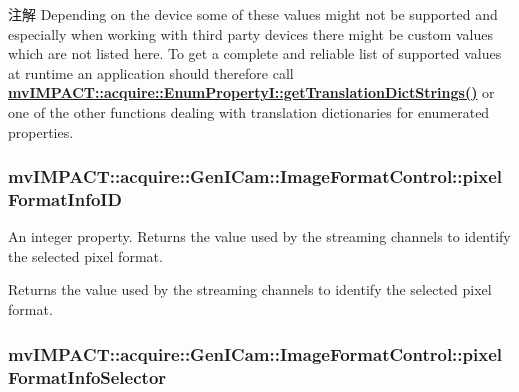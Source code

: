 \begin{DoxyNote}{注解}
Depending on the device some of these values might not be supported and especially when working with third party devices there might be custom values which are not listed here. To get a complete and reliable list of supported values at runtime an application should therefore call {\bfseries \hyperlink{classmv_i_m_p_a_c_t_1_1acquire_1_1_enum_property_i_a0ba6ccbf5ee69784d5d0b537924d26b6}{mv\+I\+M\+P\+A\+C\+T\+::acquire\+::\+Enum\+Property\+I\+::get\+Translation\+Dict\+Strings()}} or one of the other functions dealing with translation dictionaries for enumerated properties. 
\end{DoxyNote}
\hypertarget{classmv_i_m_p_a_c_t_1_1acquire_1_1_gen_i_cam_1_1_image_format_control_a883b137388bec227535b01c76661c634}{
\subsubsection[{pixel\+Format\+Info\+I\+D}]{ mv\+I\+M\+P\+A\+C\+T\+::acquire\+::\+Gen\+I\+Cam\+::\+Image\+Format\+Control\+::pixel\+Format\+Info\+I\+D}}\label{classmv_i_m_p_a_c_t_1_1acquire_1_1_gen_i_cam_1_1_image_format_control_a883b137388bec227535b01c76661c634}


An integer property. Returns the value used by the streaming channels to identify the selected pixel format. 

Returns the value used by the streaming channels to identify the selected pixel format. \hypertarget{classmv_i_m_p_a_c_t_1_1acquire_1_1_gen_i_cam_1_1_image_format_control_afece092c2b57040873197c80520a2d65}{
\subsubsection[{pixel\+Format\+Info\+Selector}]{ mv\+I\+M\+P\+A\+C\+T\+::acquire\+::\+Gen\+I\+Cam\+::\+Image\+Format\+Control\+::pixel\+Format\+Info\+Selector}}\label{classmv_i_m_p_a_c_t_1_1acquire_1_1_gen_i_cam_1_1_image_format_control_afece092c2b57040873197c80520a2d65}


